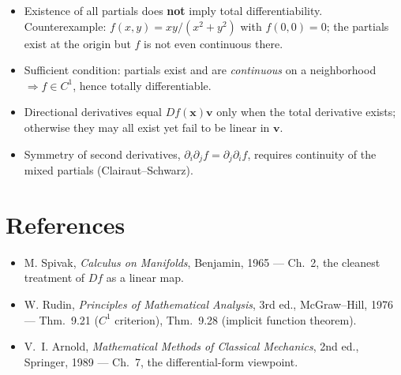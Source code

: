 \documentclass[10pt]{article}
\newcommand{\x}{\mathbf{x}}
\begin{document}
\begin{itemize}
\item Existence of all partials does \textbf{not} imply total differentiability. Counterexample:
      $f(x,y) = xy/(x^2+y^2)$ with $f(0,0)=0$; the partials exist at the origin but $f$ is not even
      continuous there.
\item Sufficient condition: partials exist and are \emph{continuous} on a neighborhood
      $\Rightarrow f\in C^1$, hence totally differentiable.
\item Directional derivatives equal $Df(\x)\mathbf{v}$ only when the total derivative exists;
      otherwise they may all exist yet fail to be linear in $\mathbf{v}$.
\item Symmetry of second derivatives, $\partial_i\partial_j f = \partial_j\partial_i f$, requires
      continuity of the mixed partials (Clairaut--Schwarz).
\end{itemize}

\section*{References}

\begin{itemize}
\item M. Spivak, \emph{Calculus on Manifolds}, Benjamin, 1965 --- Ch.~2, the cleanest treatment of
      $Df$ as a linear map.
\item W. Rudin, \emph{Principles of Mathematical Analysis}, 3rd ed., McGraw--Hill, 1976 ---
      Thm.~9.21 ($C^1$ criterion), Thm.~9.28 (implicit function theorem).
\item V.~I. Arnold, \emph{Mathematical Methods of Classical Mechanics}, 2nd ed., Springer, 1989 ---
      Ch.~7, the differential-form viewpoint.
\end{itemize}
\end{document}
